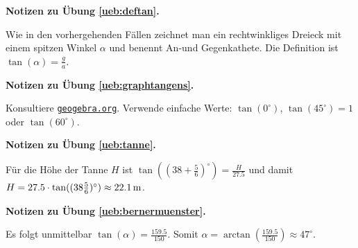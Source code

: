 \documentclass[%
11pt,%
twoside,%
titlepage,%
german,%
headsepline%
]{scrartcl}
\newcommand{\geogebralink}{\href{https://www.geogebra.org/calculator}{\texttt{geogebra.org}}}
\newcommand{\concatueb}[1]{ueb:#1}%
\newcommand{\concatlsg}[1]{lsg:#1}%
\newenvironment{lsg}[1]{%
    \par\noindent\textbf{Notizen zu Übung \ref{\concatueb{#1}}.}%
    \label{\concatlsg{#1}}
}{%
    \par%
}
\begin{document}
\begin{lsg}{deftan}
Wie in den vorhergehenden F\"allen zeichnet man ein rechtwinkliges Dreieck mit einem spitzen Winkel $\alpha$ und benennt An-und Gegenkathete. Die Definition ist $\tan(\alpha)=\frac{g}{a}$.
\end{lsg}

\begin{lsg}{graphtangens}
Konsultiere \geogebralink . Verwende einfache Werte: $\tan(0^{\circ})$, $\tan(45^{\circ})=1$ oder $\tan(60^{\circ})$.
\end{lsg}

\begin{lsg}{tanne}
F\"ur die H\"ohe der Tanne $H$ ist $\tan( (38+\frac{5}{6})^\circ)=\frac{H}{27.5}$ und damit $H=27.5\cdot \tan( (38\frac{5}{6})^\circ)\approx\unit[22.1]{m}$.
\end{lsg}

\begin{lsg}{bernermuenster}
Es folgt unmittelbar $\tan(\alpha)=\frac{159.5}{150}$. Somit $\alpha=\arctan(\frac{159.5}{150})\approx47^{\circ}$.
\end{lsg}
\end{document}

